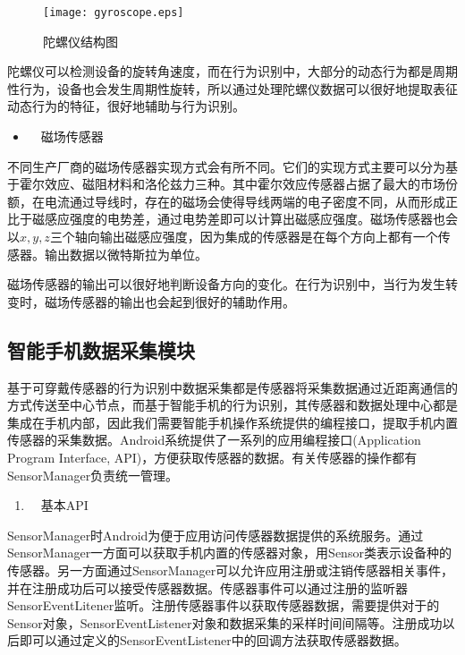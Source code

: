 \begin{figure}[ht]
\centering
\texttt{[image: gyroscope.eps]}
\caption{陀螺仪结构图}
\end{figure}

\par 陀螺仪可以检测设备的旋转角速度，而在行为识别中，大部分的动态行为都是周期性行为，设备也会发生周期性旋转，所以通过处理陀螺仪数据可以很好地提取表征动态行为的特征，很好地辅助与行为识别。

\begin{itemize}
	\item　磁场传感器
\end{itemize}
\par 不同生产厂商的磁场传感器实现方式会有所不同。它们的实现方式主要可以分为基于霍尔效应、磁阻材料和洛伦兹力三种。其中霍尔效应传感器占据了最大的市场份额，在电流通过导线时，存在的磁场会使得导线两端的电子密度不同，从而形成正比于磁感应强度的电势差，通过电势差即可以计算出磁感应强度。磁场传感器也会以$x,  y,  z$三个轴向输出磁感应强度，因为集成的传感器是在每个方向上都有一个传感器。输出数据以微特斯拉为单位。
\par 磁场传感器的输出可以很好地判断设备方向的变化。在行为识别中，当行为发生转变时，磁场传感器的输出也会起到很好的辅助作用。

\subsection{智能手机数据采集模块}
\par 基于可穿戴传感器的行为识别中数据采集都是传感器将采集数据通过近距离通信的方式传送至中心节点，而基于智能手机的行为识别，其传感器和数据处理中心都是集成在手机内部，因此我们需要智能手机操作系统提供的编程接口，提取手机内置传感器的采集数据。Android系统提供了一系列的应用编程接口(Application Program Interface, API)，方便获取传感器的数据。有关传感器的操作都有SensorManager负责统一管理。

\begin{enumerate}[(1)]
	\item　基本API
\end{enumerate}
\par SensorManager时Android为便于应用访问传感器数据提供的系统服务。通过SensorManager一方面可以获取手机内置的传感器对象，用Sensor类表示设备种的传感器。另一方面通过SensorManager可以允许应用注册或注销传感器相关事件，并在注册成功后可以接受传感器数据。传感器事件可以通过注册的监听器SensorEventLitener监听。注册传感器事件以获取传感器数据，需要提供对于的Sensor对象，SensorEventListener对象和数据采集的采样时间间隔等。注册成功以后即可以通过定义的SensorEventListener中的回调方法获取传感器数据。

